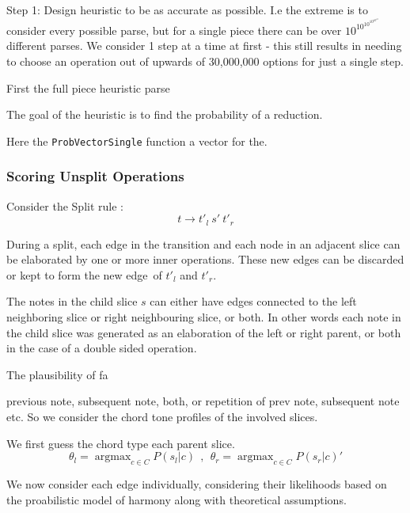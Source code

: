 \documentclass[12pt,a4paper,twoside,openright]{report} \usepackage[pdfborder={0 0 0}]{hyperref}    %
\theoremstyle{definition} \newtheorem{definition}{Definition}[section]
\begin{document}
    Step 1: Design heuristic to be as accurate as possible. I.e the extreme is to consider every possible parse, but for
    a single piece there can be over $10^{10^{10^{10^{10^{10}}}}}$ different parses. We consider 1 step at a time at
    first - this still results in needing to choose an operation out of upwards of 30,000,000 options for just a single
    step.     \par First the full piece heuristic parse \par The goal of the heuristic is to find the probability of
    a reduction. 


    Here the \texttt{ProbVectorSingle} function a vector for the.

    \FloatBarrier \subsubsection{Scoring Unsplit Operations} Consider the Split rule : \[t \to t'_{l}~s'~t'_{r}\] \par
    During a split, each edge in the transition and each node in an adjacent slice can be elaborated by one or more
    inner operations. These new edges can be discarded or kept to form the new edge of $t'_l$ and $t'_r$. \par The notes
    in the child slice $s$ can either have edges connected to the left neighboring slice or right neighbouring slice, or
    both. In other words each note in the child slice was generated as an elaboration of the left or right parent, or
    both in the case of a double sided operation. 

    The plausibility of fa

    previous note, subsequent note, both, or repetition of prev note, subsequent note etc. So we consider the chord tone
    profiles of the involved slices. 

    We first guess the chord type each parent slice. \[\theta_l = \mathop{argmax}_{c \in C} P(s_l|c) ~~,~~ \theta_r
    = \mathop{argmax}_{c \in C} P(s_r|c) '\]

    We now consider each edge individually, considering their likelihoods based on the proabilistic model of harmony
    along with theoretical assumptions. 
\end{document}
